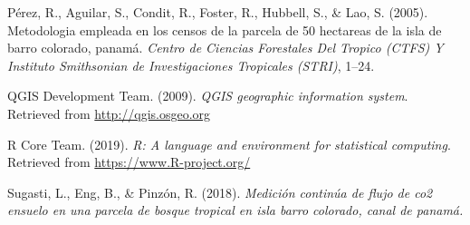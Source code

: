 \documentclass[11pt,]{article}
\begin{document}
\hypertarget{ref-perez2005metodologia}{}
Pérez, R., Aguilar, S., Condit, R., Foster, R., Hubbell, S., \& Lao, S.
(2005). Metodologia empleada en los censos de la parcela de 50 hectareas
de la isla de barro colorado, panamá. \emph{Centro de Ciencias
Forestales Del Tropico (CTFS) Y Instituto Smithsonian de Investigaciones
Tropicales (STRI)}, 1--24.

\hypertarget{ref-QGIS_software}{}
QGIS Development Team. (2009). \emph{QGIS geographic information
system}. Retrieved from \url{http://qgis.osgeo.org}

\hypertarget{ref-R}{}
R Core Team. (2019). \emph{R: A language and environment for statistical
computing}. Retrieved from \url{https://www.R-project.org/}

\hypertarget{ref-sugastimedicion}{}
Sugasti, L., Eng, B., \& Pinzón, R. (2018). \emph{Medición continúa de
flujo de co2 ensuelo en una parcela de bosque tropical en isla barro
colorado, canal de panamá.}




\newpage
\singlespacing 
\end{document}
